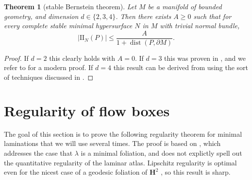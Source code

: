 \documentclass[final,12pt, leqno]{brownthesis}
\newcommand{\Hyp}{\mathbf H}
\newcommand*\dif{\mathop{}\!\mathrm{d}}
\DeclareMathOperator{\dist}{dist}
\newcommand{\Two}{\mathrm{I\!I}}
\newtheorem{theorem}{Theorem}[section]
\newtheorem{proposition}[theorem]{Proposition}
\theoremstyle{definition}
\numberwithin{equation}{section}
\begin{document}

\begin{theorem}[stable Bernstein theorem]
	Let $M$ be a manifold of bounded geometry, and dimension $d \in \{2, 3, 4\}$.
	Then there exists $A \geq 0$ such that for every complete stable minimal hypersurface $N$ in $M$ with trivial normal bundle,
	$$|\Two_N(P)| \leq \frac{A}{1 + \dist(P, \partial M)}.$$
\end{theorem}
\begin{proof}
	If $d = 2$ this clearly holds with $A = 0$.
	If $d = 3$ this was proven in \cite{Schoen2016}, and we refer to \cite[Theorem 2.10]{colding2011course} for a modern proof.
	If $d = 4$ this result can be derived from \cite[Theorem 1]{Chodosh2021} using the sort of techniques discussed in \cite[\S3]{White13}.
\end{proof}


\section{Regularity of flow boxes}\label{Regularity}
The goal of this section is to prove the following regularity theorem for minimal laminations that we will use several times.
The proof is based on \cite[Theorem 1.1]{Solomon86}, which addresses the case that $\lambda$ is a minimal foliation, and does not explictly spell out the quantitative regularity of the laminar atlas.
Lipschitz regularity is optimal even for the nicest case of a geodesic foliation of $\Hyp^2$ \cite[\S1]{Solomon86}, so this result is sharp.
\end{document}
